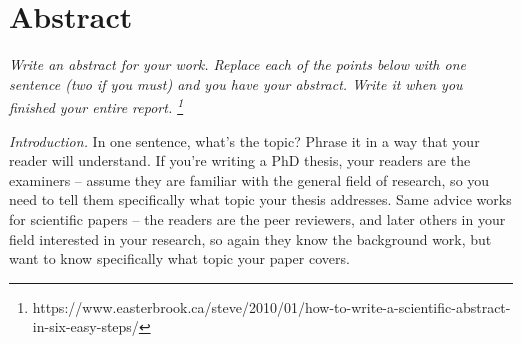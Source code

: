 \newenvironment{gfquote}[1]{%
  \newcommand{\fqauthor}{\relax}
  \ifthenelse{\isempty{#1}}
  {}%
  {\renewcommand{\fqauthor}{\hfill\textsc{\textemdash #1}}}
  \vspace{1em}
  \begin{list}{}{%
    \setlength{\leftmargin}{0.2\textwidth}
    \setlength{\rightmargin}{0.2\textwidth}
  }
  \item[]%
  \begin{picture}(0,0)(0,0)
    \put(-15,-5){\makebox(0,0){%
        \scalebox{4.5}{\textcolor{quotemark}{\bfseries \glqq}}}%
    }
  \end{picture}\em\ignorespaces%
}{%
  \newline%
  \makebox[0pt][l]{\hspace{0.6\textwidth}%
    \begin{picture}(0,0)(0,0)
      \put(15,10){\makebox(0,0){%
          \scalebox{4.5}{\textcolor{quotemark}{\rmfamily\bfseries \grqq}}}%
      }
    \end{picture}}%
  \fqauthor
  \end{list}
}

\usepackage{scrhack}



\raggedbottom
{}
\Titelblatt

\pagestyle{plain.scrheadings}
\renewcommand*{\chapterpagestyle}{plain.scrheadings}

\section*{Abstract}
\emph{Write an abstract for your work.
  Replace each of the points below with one sentence (two if you must) and you have your abstract.
  Write it when you finished your entire report.
  \footnote{https://www.easterbrook.ca/steve/2010/01/how-to-write-a-scientific-abstract-in-six-easy-steps/}}

\emph{Introduction.}
In one sentence, what’s the topic?
Phrase it in a way that your reader will understand.
If you’re writing a PhD thesis, your readers are the examiners – assume they are familiar with the general field of research, so you need to tell them specifically what topic your thesis addresses.
Same advice works for scientific papers – the readers are the peer reviewers, and later others in your field interested in your research, so again they know the background work, but want to know specifically what topic your paper covers.

